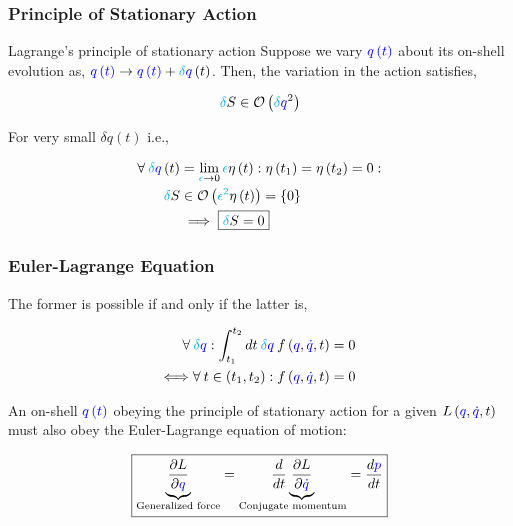 \documentclass{beamer}
\begin{document}
\begin{frame}
\frametitle{Principle of Stationary Action}

\begin{block}{Lagrange's principle of stationary action}
Suppose we vary $\textcolor{blue}{q \left( t \right)}$ about its on-shell evolution as, $\textcolor{blue}{q \left( t \right)} \to \textcolor{blue}{q \left( t \right)} + \textcolor{cyan}{\delta} \textcolor{blue}{q} \left( t \right)$. Then, the variation in the action satisfies,

$$\textcolor{cyan}{\delta} S \in \mathcal{O} \left( \textcolor{cyan}{\delta} \textcolor{blue}{q}^2  \right)$$
\end{block}

\begin{corollary}
For very small $\delta q \left( t \right)$ i.e.,

\begin{align*}
\forall \: \textcolor{cyan}{\delta} \textcolor{blue}{q} \left( t \right) & = \lim_{\textcolor{cyan}{\epsilon} \to 0} \textcolor{cyan}{\epsilon} \eta \left( t \right) : \eta \left( t_1 \right) = \eta \left( t_2 \right) = 0 : \\
\textcolor{cyan}{\delta} S & \in \mathcal{O} \left( \textcolor{cyan}{\epsilon^2} \eta \left( t \right) \right) = \left\{ 0 \right\} \\
& \implies \boxed{\textcolor{cyan}{\delta} S = 0}
\end{align*}
\end{corollary}
\end{frame}

\begin{frame}
\frametitle{Euler-Lagrange Equation}

\begin{lemma}
The former is possible if and only if the latter is,

\begin{align*}
\forall \: \textcolor{cyan}{\delta} \textcolor{blue}{q} : \int_{t_1}^{t_2} dt \: \textcolor{cyan}{\delta} \textcolor{blue}{q} \: f \left( \textcolor{blue}{q}, \textcolor{blue}{\dot{q}}, t \right) & = 0 \\
\Longleftrightarrow \forall \: t \in \left( t_1, t_2 \right) : f \left( \textcolor{blue}{q}, \textcolor{blue}{\dot{q}}, t \right) & = 0
\end{align*}
\end{lemma}

\begin{theorem}
An on-shell $\textcolor{blue}{q \left( t \right)}$ obeying the principle of stationary action for a given $L \left( \textcolor{blue}{q}, \textcolor{blue}{\dot{q}}, t \right)$ must also obey the Euler-Lagrange equation of motion:

$$\boxed{\underset{\text{Generalized force}}{\underbrace{\frac{\partial L}{\partial \textcolor{blue}{q}}}} = \underset{\text{Conjugate momentum}}{\frac{d}{dt} \underbrace{\frac{\partial L}{\partial \textcolor{blue}{\dot{q}}}}} = \frac{d \textcolor{blue}{p}}{dt}}$$
\end{theorem}
\end{frame}
\end{document}
